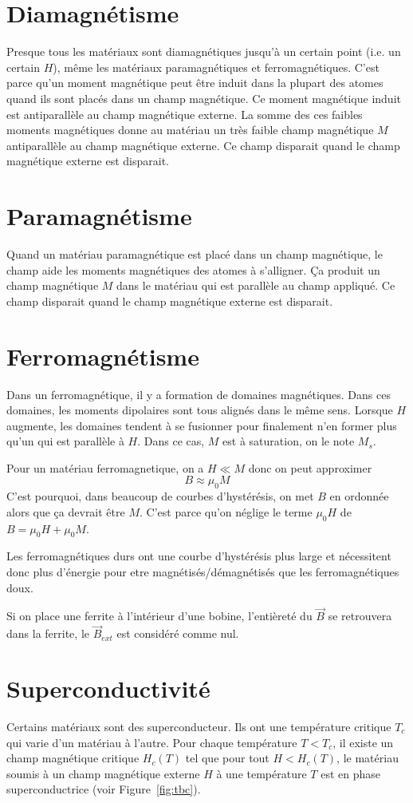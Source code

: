 \documentclass[11pt,a4paper]{article}
\newcommand{\B}{\vec B}
\begin{document}
\section{Diamagnétisme}
Presque tous les matériaux sont diamagnétiques jusqu'à un certain point (i.e. un certain $H$), même les matériaux paramagnétiques et ferromagnétiques.
C'est parce qu'un moment magnétique peut être induit dans la plupart des atomes quand ils sont placés dans un champ magnétique.
Ce moment magnétique induit est antiparallèle au champ magnétique externe.
La somme des ces faibles moments magnétiques donne au matériau un très faible champ magnétique $M$ antiparallèle au champ magnétique externe.
Ce champ disparait quand le champ magnétique externe est disparait.

\section{Paramagnétisme}
Quand un matériau paramagnétique est placé dans un champ magnétique, le champ aide les moments magnétiques des atomes à s'alligner.
Ça produit un champ magnétique $M$ dans le matériau qui est parallèle au champ appliqué.
Ce champ disparait quand le champ magnétique externe est disparait.

\section{Ferromagnétisme}
\label{sec:ferro}
Dans un ferromagnétique, il y a formation de domaines magnétiques.
Dans ces domaines, les moments dipolaires sont tous alignés dans le même sens.
Lorsque $H$ augmente, les domaines tendent à se fusionner pour finalement n'en former plus qu'un qui est parallèle à $H$.
Dans ce cas, $M$ est à saturation, on le note $M_s$.

Pour un matériau ferromagnetique, on a $H \ll M$ donc on peut approximer
\[ B \approx \mu_0 M \]
C'est pourquoi, dans beaucoup de courbes d'hystérésis, on met $B$ en ordonnée alors que ça devrait être $M$.
C'est parce qu'on néglige le terme $\mu_0 H$ de $B = \mu_0 H + \mu_0 M$.


Les ferromagnétiques durs ont une courbe d'hystérésis plus large et nécessitent donc plus d'énergie pour etre magnétisés/démagnétisés que les ferromagnétiques doux.

Si on place une ferrite à l'intérieur d'une bobine, l'entièreté du $\B$ se retrouvera dans la ferrite, le $\B_{ext}$ est considéré comme nul.

\section{Superconductivité}
Certains matériaux sont des superconducteur.
Ils ont une température critique $T_c$ qui varie d'un matériau à l'autre.
Pour chaque température $T < T_c$, il existe un champ magnétique critique $H_c(T)$ tel que
pour tout $H < H_c(T)$, le matériau soumis à un champ magnétique externe $H$ à une température $T$ est en phase superconductrice
(voir Figure~\ref{fig:tbc}).
\end{document}
